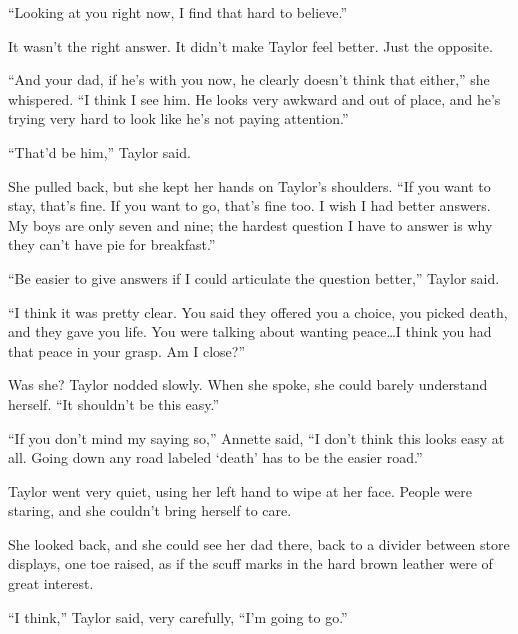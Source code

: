 ``Looking at you right now, I find that hard to believe.''



It wasn't the right answer.  It didn't make Taylor feel better.  Just the opposite.



``And your dad, if he's with you now, he clearly doesn't think that either,'' she whispered.  ``I think I see him.  He looks very awkward and out of place, and he's trying very hard to look like he's not paying attention.''



``That'd be him,'' Taylor said.



She pulled back, but she kept her hands on Taylor's shoulders.  ``If you want to stay, that's fine.  If you want to go, that's fine too.  I wish I had better answers.  My boys are only seven and nine; the hardest question I have to answer is why they can't have pie for breakfast.''



``Be easier to give answers if I could articulate the question better,'' Taylor said.



``I think it was pretty clear.  You said they offered you a choice, you picked death, and they gave you life.  You were talking about wanting peace\ldots I think you had that peace in your grasp.  Am I close?''



Was she?  Taylor nodded slowly.  When she spoke, she could barely understand herself.  ``It shouldn't be this easy.''



``If you don't mind my saying so,'' Annette said, ``I don't think this looks easy at all.  Going down any road labeled `death' has to be the easier road.''



Taylor went very quiet, using her left hand to wipe at her face.  People were staring, and she couldn't bring herself to care.



She looked back, and she could see her dad there, back to a divider between store displays, one toe raised, as if the scuff marks in the hard brown leather were of great interest.



``I think,'' Taylor said, very carefully, ``I'm going to go.''



